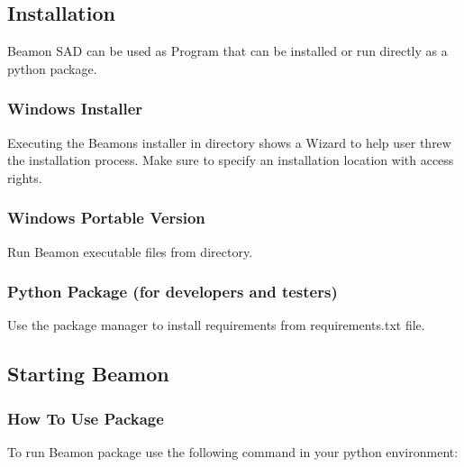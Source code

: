 \documentclass[letterpaper,10pt,english]{sphinxmanual}
\begin{document}
\subsection{Installation}
\label{\detokenize{getting_started:installation}}
Beamon SAD can be used as Program that can be installed or run directly as a python package.


\subsubsection{Windows Installer}
\label{\detokenize{getting_started:windows-installer}}
Executing the Beamons installer in  directory shows a Wizard to help user threw the installation process.
Make sure to specify an installation location with access rights.


\subsubsection{Windows Portable Version}
\label{\detokenize{getting_started:windows-portable-version}}
Run Beamon executable files from  directory.


\subsubsection{Python Package (for developers and testers)}
\label{\detokenize{getting_started:python-package-for-developers-and-testers}}
Use the package manager  to install requirements from requirements.txt file.


\subsection{Starting Beamon}
\label{\detokenize{getting_started:starting-beamon}}

\subsubsection{How To Use  Package}
\label{\detokenize{getting_started:how-to-use-beamon-package}}
To run Beamon package use the following command in your python environment:

\begin{sphinxVerbatim}[commandchars=\\\{\}]
  
\end{sphinxVerbatim}
\end{document}
